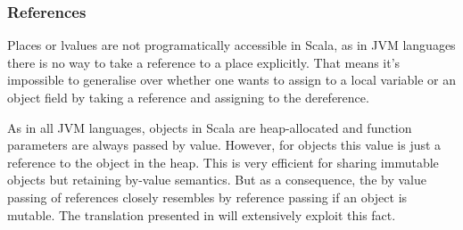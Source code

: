 \subsubsection{References}

Places or lvalues are not programatically accessible in Scala, as in JVM
languages there is no way to take a reference to a place explicitly.
That means it's impossible to generalise over whether one wants to
assign to a local variable or an object field by taking a reference and
assigning to the dereference.

As in all JVM languages, objects in Scala are heap-allocated and
function parameters are always passed by value. However, for objects
this value is just a reference to the object in the heap. This is very
efficient for sharing immutable objects but retaining by-value
semantics. But as a consequence, the by value passing of references
closely resembles by reference passing if an object is mutable. The
translation presented in  will extensively exploit this fact.

